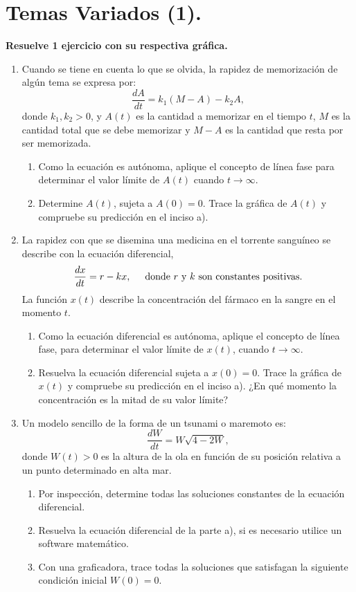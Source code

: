 \documentclass[letterpaper,10pt]{memoir}
\begin{document}
\section*{Temas Variados (1).} %
\textbf{Resuelve 1 ejercicio con su respectiva gráfica.} 
\begin{enumerate}
	\item Cuando se tiene en cuenta lo que se olvida, la rapidez de memorización de algún tema se expresa por:
		\[
			\dfrac{dA}{dt} = k_1(M-A) -k_2A,
		\]
		donde \(k_1,k_2>0\), y \(A(t)\) es la cantidad a memorizar en el tiempo \(t\), \(M\) es la cantidad total que se debe memorizar y \(M-A\) es la cantidad que resta por ser memorizada.
		\begin{enumerate}
			\item Como la ecuación es autónoma, aplique el concepto de línea fase para determinar el valor límite de \(A(t)\) cuando \(t \longrightarrow \infty\).
			\item Determine \(A(t)\), sujeta a \(A(0) =0\). Trace la gráfica de \(A(t)\) y compruebe su predicción en el inciso a).
		\end{enumerate}
	\item La rapidez con que se disemina una medicina en el torrente sanguíneo se describe con la ecuación diferencial,
		\[
			\dfrac{dx}{dt} =r-kx, \hspace{5mm} \mbox{donde \(r\) y \(k\) son constantes positivas.}
		\]
		La función \(x(t)\) describe la concentración del fármaco en la sangre en el momento \(t\).
		\begin{enumerate}
			\item Como la ecuación diferencial es autónoma, aplique el concepto de línea fase, para determinar el valor límite de \(x(t)\), cuando \(t \longrightarrow \infty\).
			\item Resuelva la ecuación diferencial sujeta a \(x(0) =0\). Trace la gráfica de \(x(t)\) y compruebe su predicción en el inciso a). ¿En qué momento la concentración es la mitad de su valor límite?
		\end{enumerate}
	\item Un modelo sencillo de la forma de un tsunami o maremoto es:
		\[
			\dfrac{dW}{dt} = W \sqrt{4-2W},
		\]
		donde \(W(t) >0\) es la altura de la ola en función de su posición relativa a un punto determinado en alta mar.
		\begin{enumerate}
			\item Por inspección, determine todas las soluciones constantes de la ecuación diferencial.
			\item Resuelva la ecuación diferencial de la parte a), si es necesario utilice un software matemático.
			\item Con una graficadora, trace todas la soluciones que satisfagan la siguiente condición inicial \(W(0) =0\).
		\end{enumerate}
\end{enumerate}
\end{document}
